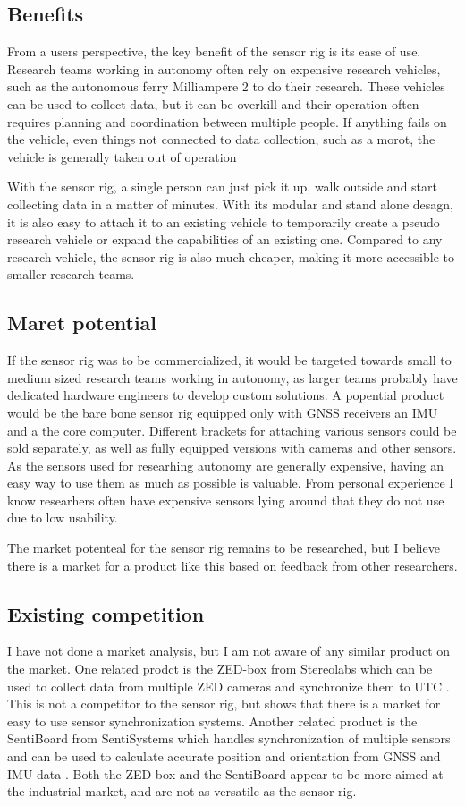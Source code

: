 \documentclass{iopconfser}
\begin{document}
\subsection*{Benefits}
From a users perspective, the key benefit of the sensor rig is its ease of use.
Research teams working in autonomy often rely on expensive research vehicles, such as the autonomous ferry Milliampere 2 to do their research.
These vehicles can be used to collect data, but it can be overkill and their operation often requires planning and coordination between multiple people.
If anything fails on the vehicle, even things not connected to data collection, such as a morot, the vehicle is generally taken out of operation

With the sensor rig, a single person can just pick it up, walk outside and start collecting data in a matter of minutes.
With its modular and stand alone desagn, it is also easy to attach it to an existing vehicle to temporarily create a pseudo research vehicle or expand the capabilities of an existing one.
Compared to any research vehicle, the sensor rig is also much cheaper, making it more accessible to smaller research teams.

\subsection*{Maret potential}
If the sensor rig was to be commercialized, it would be targeted towards small to medium sized research teams working in autonomy, as larger teams probably have dedicated hardware engineers to develop custom solutions.
A popential product would be the bare bone sensor rig equipped only with GNSS receivers an IMU and a the core computer.
Different brackets for attaching various sensors could be sold separately, as well as fully equipped versions with cameras and other sensors.
As the sensors used for researhing autonomy are generally expensive, having an easy way to use them as much as possible is valuable.
From personal experience I know researhers often have expensive sensors lying around that they do not use due to low usability.

The market potenteal for the sensor rig remains to be researched, but I believe there is a market for a product like this based on feedback from other researchers.

\subsection*{Existing competition}
I have not done a market analysis, but I am not aware of any similar product on the market.
One related prodct is the ZED-box from Stereolabs which can be used to collect data from multiple ZED cameras and synchronize them to UTC \cite{stereolabsZEDBoxEmbedded}. 
This is not a competitor to the sensor rig, but shows that there is a market for easy to use sensor synchronization systems.
Another related product is the SentiBoard from SentiSystems which handles synchronization of multiple sensors and can be used to calculate accurate position and orientation from GNSS and IMU data \cite{sentisystemsSentiSystemsSolutions}.
Both the ZED-box and the SentiBoard appear to be more aimed at the industrial market, and are not as versatile as the sensor rig.
\end{document}
